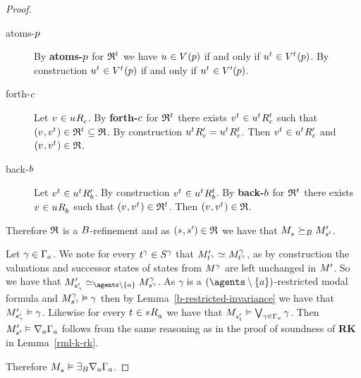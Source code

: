 \begin{proof}
\begin{description}
        \hfill
        \begin{description}
            \item[atoms-$\atomP$] 
                By {\bf atoms-$\atomP$} for $\refinement^{\kStateT}$ we have $\kStateU \in \kValuation(\atomP)$ if and only if $\kStateU[\kStateT] \in \kValuation[\kStateT](\atomP)$.
                By construction $\kStateU[\kStateT] \in \kValuation[\kStateT](\atomP)$ if and only if $\kStateU[\kStateT] \in \kValuationP(\atomP)$.
            \item[forth-$\agentC$]
                Let $\kStateV \in \kSuccessorsC{\kStateU}$.
                By {\bf forth-$\agentC$} for $\refinement^{\kStateT}$ there exists $\kStateV[\kStateT] \in \kSuccessorsC[\kStateT]{\kStateU[\kStateT]}$ such that $(\kStateV, \kStateV[\kStateT]) \in \refinement^{\kStateT} \subseteq \refinement$.
                By construction $\kSuccessorsPC{\kStateU[\kStateT]} = \kSuccessorsC[\kStateT]{\kStateU[\kStateT]}$.
                Then $\kStateV[\kStateT] \in \kSuccessorsPC{\kStateU[\kStateT]}$ and $(\kStateV, \kStateV[\kStateT]) \in \refinement$.
            \item[back-$\agentB$]
                Let $\kStateV[\kStateT] \in \kSuccessorsPB{\kStateU[\kStateT]}$.
                By construction $\kStateV[\kStateT] \in \kSuccessorsB[\kStateT]{\kStateU[\kStateT]}$.
                By {\bf back-$\agentB$} for $\refinement^{\kStateT}$ there exists $\kStateV \in \kSuccessorsB{\kStateU}$ such that $(\kStateV, \kStateV[\kStateT]) \in \refinement^{\kStateT}$.
                Then $(\kStateV, \kStateV[\kStateT]) \in \refinement$.
        \end{description}
\end{description}

Therefore $\refinement$ is a $\agentsB$-refinement and as $(\kStateS, \kStateSP) \in \refinement$ we have that $\kPModel{\kStateS} \simulatesBs \kPModelP{\kStateSP}$.

Let $\gamma \in \Gamma_\agentA$.
We note for every $\kStateT[\gamma] \in \kStates[\gamma]$ that $\kPModelP{\kStateT[\gamma]} \bisimilar \kPModel[\gamma]{\kStateT[\gamma]}$, as by construction the valuations and successor states of states from $\kModel[\gamma]$ are left unchanged in $\kModelP$.
So we have that $\kPModelP{\kStateSP_\gamma} \bisimilar[\agents \setminus \{\agentA\}] \kPModel[\gamma]{\kStateS[\gamma]}$.
As $\gamma$ is a $(\agents \setminus \{\agentA\})$-restricted modal formula and $\kPModel[\gamma]{\kStateS[\gamma]} \entails \gamma$ then by Lemma~\ref{b-restricted-invariance} we have that $\kPModelP{\kStateSP_\gamma} \entails \gamma$.
Likewise for every $\kStateT \in \kSuccessorsA{\kStateS}$ we have that $\kPModel{\kStateSP_{\kStateT}} \entails \bigvee_{\gamma \in \Gamma_\agentA} \gamma$.
Then $\kPModelP{\kStateSP} \entails \coversA \Gamma_\agentA$ follows from the same reasoning as in the proof of soundness of {\bf RK} in Lemma~\ref{rml-k-rk}.

Therefore $\kPModel{\kStateS} \entails \somerefsBs \coversA \Gamma_\agentA$.
\end{proof}

